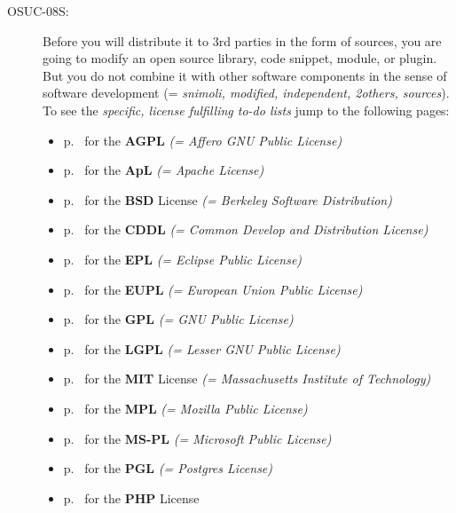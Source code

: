 \begin{description}
\item[OSUC-08S:]\label{OSUC-08S-DEF} Before you will distribute it to 3rd
parties in the form of sources, you are going to modify an open source library,
code snippet, module, or plugin. But you do not combine it with other software
components in the sense of software development (= \textit{snimoli, modified,
independent, 2others, sources}). To see the \textit{specific, license fulfilling
to-do lists} jump to the following pages:
  \begin{itemize}
    \item p.\ \pageref{OSUC-08S-AGPL} for the \textbf{AGPL}
      \textit{(= Affero GNU Public License)} 
    \item p.\ \pageref{OSUC-08S-Apache20} for the \textbf{ApL}
      \textit{(= Apache License)}
    \item p.\ \pageref{OSUC-08S-BSD} for the \textbf{BSD} License
      \textit{(= Berkeley Software Distribution)}
    \item p.\ \pageref{OSUC-08S-CDDL} for the \textbf{CDDL}
      \textit{(= Common Develop and Distribution License)}  
    \item p.\ \pageref{OSUC-08S-EPL} for the \textbf{EPL}
      \textit{(= Eclipse Public License)}     
    \item p.\ \pageref{OSUC-08S-EUPL} for the \textbf{EUPL}
      \textit{(= European Union Public License)} 
    \item p.\ \pageref{OSUC-08S-GPL} for the \textbf{GPL}
       \textit{(= GNU Public License)} 
    \item p.\ \pageref{OSUC-08S-LGPL} for the \textbf{LGPL}
      \textit{(= Lesser GNU Public License)}           
    \item p.\ \pageref{OSUC-08S-MIT} for the \textbf{MIT} License
       \textit{(= Massachusetts Institute of Technology)} 
    \item p.\ \pageref{OSUC-08S-MPL} for the \textbf{MPL}
      \textit{(= Mozilla Public License)}     
    \item p.\ \pageref{OSUC-08S-MS-PL} for the \textbf{MS-PL}
      \textit{(= Microsoft Public License)} 
    \item p.\ \pageref{OSUC-08S-PGL} for the \textbf{PGL}
      \textit{(= Postgres License)} 
    \item p.\ \pageref{OSUC-08S-PHP} for the \textbf{PHP} License 
  \end{itemize}


\end{description}
